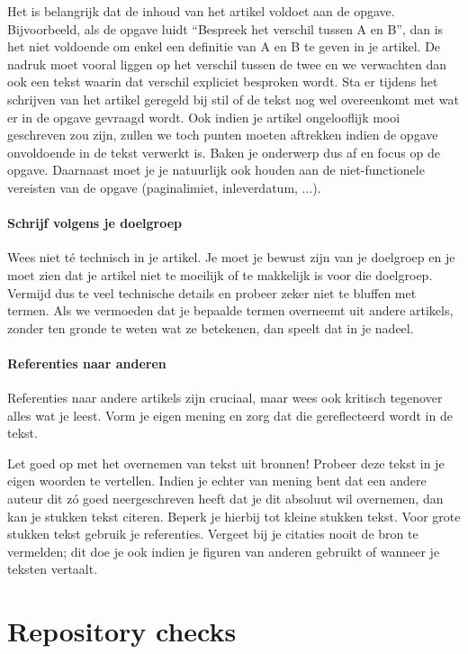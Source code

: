 \documentclass[a4paper]{article}
\begin{document}
Het is belangrijk dat de inhoud van het artikel voldoet aan de opgave.
Bijvoorbeeld, als de opgave luidt ``Bespreek het verschil tussen A en B'', dan is het niet voldoende om enkel een definitie van A en B te geven in je artikel.
De nadruk moet vooral liggen op het verschil tussen de twee en we verwachten dan ook een tekst waarin dat verschil expliciet besproken wordt.
Sta er tijdens het schrijven van het artikel geregeld bij stil of de tekst nog wel overeenkomt met wat er in de opgave gevraagd wordt.
Ook indien je artikel ongelooflijk mooi geschreven zou zijn, zullen we toch punten moeten aftrekken indien de opgave onvoldoende in de tekst verwerkt is.
Baken je onderwerp dus af en focus op de opgave.
Daarnaast moet je je natuurlijk ook houden aan de niet-functionele vereisten van de opgave (paginalimiet, inleverdatum, ...).


\paragraph{Schrijf volgens je doelgroep}

Wees niet t\'e technisch in je artikel.
Je moet je bewust zijn van je doelgroep en je moet zien dat je artikel niet te moeilijk of te makkelijk is voor die doelgroep.
Vermijd dus te veel technische details en probeer zeker niet te bluffen met termen.
Als we vermoeden dat je bepaalde termen overneemt uit andere artikels, zonder ten gronde te weten wat ze betekenen, dan speelt dat in je nadeel.


\paragraph{Referenties naar anderen}

Referenties naar andere artikels zijn cruciaal, maar wees ook kritisch tegenover alles wat je leest.
Vorm je eigen mening en zorg dat die gereflecteerd wordt in de tekst.

Let goed op met het overnemen van tekst uit bronnen!
Probeer deze tekst in je eigen woorden te vertellen.
Indien je echter van mening bent dat een andere auteur dit z\'o goed neergeschreven heeft dat je dit absoluut wil overnemen, dan kan je stukken tekst citeren.
Beperk je hierbij tot kleine stukken tekst.
Voor grote stukken tekst gebruik je referenties.
Vergeet bij je citaties nooit de bron te vermelden; dit doe je ook indien je figuren van anderen gebruikt of wanneer je teksten vertaalt.


\section{Repository checks}
\end{document}
